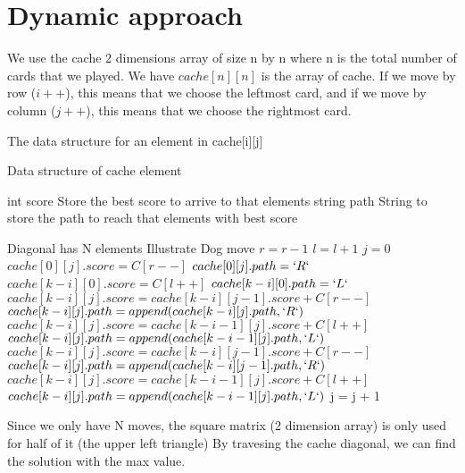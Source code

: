 \documentclass{article}
\begin{document}
\section{Dynamic approach}

We use the cache 2 dimensions array of size n by n where n is the total number of cards that we played. We have $cache[n][n]$ is the array of cache. If we move by row ($i++$), this means that we choose the leftmost card, and if we move by column ($j++$), this means that we choose the rightmost card.

The data structure for an element in cache[i][j]
\begin{algorithm}[H]
\begin{algorithmic}
\caption{Data structure of cache element}
\State int score \Comment Store the best score to arrive to that elements
\State string path \Comment String to store the path to reach that elements with best score
\end{algorithmic}
\end{algorithm}
\begin{algorithm}[H]
\begin{algorithmic}
\caption{}
 \Comment Diagonal has N elements
	 \Comment Illustrate Dog move
	\State $r = r - 1$
	\Else \State $l = l + 1$ 
	\EndIf
	\State $j = 0$
			\State $cache[0][j].score = C[r--]$
			\State $cache[0][j].path = `R`$
			\State $cache[k-i][0].score = C[l++]$ 
			\State $cache[k-i][0].path = `L`$
		\Else 
			   	\State $cache[k-i][j].score = cache[k-i][j-1].score + C[r--]$
				\State $cache[k-i][j].path = append(cache[k-i][j].path,`R`)$
			    \State $cache[k-i][j].score = cache[k-i-1][j].score + C[l++]$
				\State $cache[k-i][j].path = append(cache[k-i-1][j].path,`L`)$
				\State $cache[k-i][j].score = cache[k-i][j-1].score + C[r--]$
				\State $cache[k-i][j].path = append(cache[k-i][j-1].path,`R`)$
			\Else 
				\State $cache[k-i][j].score = cache[k-i-1][j].score + C[l++]$
				\State $cache[k-i][j].path = append(cache[k-i-1][j].path,`L`)$	
			\EndIf 
		\EndIf
		\State j = j + 1
	\EndFor
\EndFor
\EndProcedure
\end{algorithmic}
\end{algorithm}

Since we only have N moves, the square matrix (2 dimension array) is only used for half of it (the upper left triangle)
By travesing the cache diagonal, we can find the solution with the max value.
\end{document}
